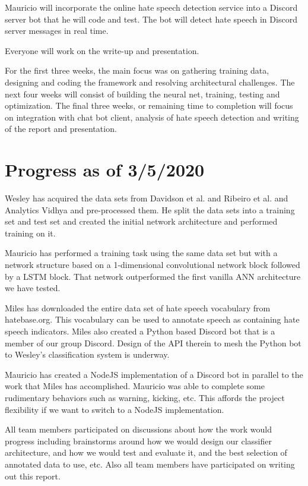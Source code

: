 \documentclass[conference]{sig-alternate-05-2015}
\begin{document}
Mauricio will incorporate the online hate speech detection service into a Discord server bot that he will code and test. The bot will detect hate speech in Discord server messages in real time.

Everyone will work on the write-up and presentation.

For the first three weeks, the main focus was on gathering training data, designing and coding the framework and resolving architectural challenges.  The next four weeks will consist of building the neural net, training, testing and optimization.  The final three weeks, or remaining time to completion will focus on integration with chat bot client, analysis of hate speech detection and writing of the report and presentation.

\section{Progress as of 3/5/2020}

Wesley has acquired the data sets from Davidson et al. and Ribeiro et al. and Analytics Vidhya and pre-processed them. He split the data sets into a training set and test set and created the initial network architecture and performed training on it.

Mauricio has performed a training task using the same data set but with a network structure based on a 1-dimensional convolutional network block followed by a LSTM block. That network outperformed the first vanilla ANN architecture we have tested.

Miles has downloaded the entire data set of hate speech vocabulary from hatebase.org.  This vocabulary can be used to annotate speech as containing hate speech indicators.  Miles also created a Python based Discord bot that is a member of our group Discord.  Design of the API therein to mesh the Python bot to Wesley's classification system is underway.

Mauricio has created a NodeJS implementation of a Discord bot in parallel to the work that Miles has accomplished.  Mauricio was able to complete some rudimentary behaviors such as warning, kicking, etc.  This affords the project flexibility if we want to switch to a NodeJS implementation.

All team members participated on discussions about how the work would progress including brainstorms around how we would design our classifier architecture, and how we would test and evaluate it, and the best selection of annotated data to use, etc. Also all team members have participated on writing out this report. 
\end{document}
